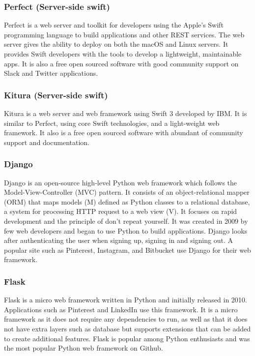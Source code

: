 \subsubsection{Perfect (Server-side swift)}
Perfect \cite{perfect} is a web server and toolkit for developers using the Apple's Swift programming language to build applications and other REST services.  The web server gives the ability to deploy on both the macOS and Linux servers. It provides Swift developers with the tools to develop a lightweight, maintainable apps. It is also a free open sourced software with good community support on Slack and Twitter applications.

\subsubsection{Kitura (Server-side swift)}
Kitura \cite{kitura} is a web server and web framework using Swift 3 developed by IBM. It is similar to Perfect, using core Swift technologies, and a light-weight web framework. It also is a free open sourced software with abundant of community support and documentation.

\subsubsection{Django}
Django \cite{django} is an open-source high-level Python web framework which follows the Model-View-Controller (MVC) pattern. It consists of an object-relational mapper (ORM) that maps models (M) defined as Python classes to a relational database, a system for processing HTTP request to a web view (V). It focuses on rapid development and the principle of don't repeat yourself. It was created in 2009 by few web developers and began to use Python to build applications. Django looks after authenticating the user when signing up, signing in and signing out. A popular site such as Pinterest, Instagram, and Bitbucket use Django for their web framework.

\subsubsection{Flask}
Flask \cite{flask} is a micro web framework written in Python and initially released in 2010. Applications such as Pinterest and LinkedIn use this framework. It is a micro framework as it does not require any dependencies to run, as well as that it does not have extra layers such as database but supports extensions that can be added to create additional features. Flask is popular among Python enthusiasts and was the most popular Python web framework on Github.


